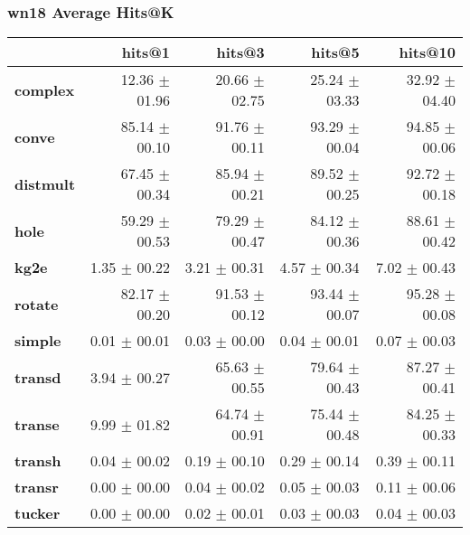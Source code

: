 \documentclass{article}
\begin{document}
\subsubsection{wn18 Average Hits@K}
    \begin{center}
    \begin{tabular}{lrrrr}
\toprule
{} &         hits@1 &         hits@3 &         hits@5 &        hits@10 \\
\midrule
\textbf{complex } &  12.36 $\pm$ 01.96 &  20.66 $\pm$ 02.75 &  25.24 $\pm$ 03.33 &  32.92 $\pm$ 04.40 \\
\textbf{conve   } &  85.14 $\pm$ 00.10 &  91.76 $\pm$ 00.11 &  93.29 $\pm$ 00.04 &  94.85 $\pm$ 00.06 \\
\textbf{distmult} &  67.45 $\pm$ 00.34 &  85.94 $\pm$ 00.21 &  89.52 $\pm$ 00.25 &  92.72 $\pm$ 00.18 \\
\textbf{hole    } &  59.29 $\pm$ 00.53 &  79.29 $\pm$ 00.47 &  84.12 $\pm$ 00.36 &  88.61 $\pm$ 00.42 \\
\textbf{kg2e    } &   1.35 $\pm$ 00.22 &   3.21 $\pm$ 00.31 &   4.57 $\pm$ 00.34 &   7.02 $\pm$ 00.43 \\
\textbf{rotate  } &  82.17 $\pm$ 00.20 &  91.53 $\pm$ 00.12 &  93.44 $\pm$ 00.07 &  95.28 $\pm$ 00.08 \\
\textbf{simple  } &   0.01 $\pm$ 00.01 &   0.03 $\pm$ 00.00 &   0.04 $\pm$ 00.01 &   0.07 $\pm$ 00.03 \\
\textbf{transd  } &   3.94 $\pm$ 00.27 &  65.63 $\pm$ 00.55 &  79.64 $\pm$ 00.43 &  87.27 $\pm$ 00.41 \\
\textbf{transe  } &   9.99 $\pm$ 01.82 &  64.74 $\pm$ 00.91 &  75.44 $\pm$ 00.48 &  84.25 $\pm$ 00.33 \\
\textbf{transh  } &   0.04 $\pm$ 00.02 &   0.19 $\pm$ 00.10 &   0.29 $\pm$ 00.14 &   0.39 $\pm$ 00.11 \\
\textbf{transr  } &   0.00 $\pm$ 00.00 &   0.04 $\pm$ 00.02 &   0.05 $\pm$ 00.03 &   0.11 $\pm$ 00.06 \\
\textbf{tucker  } &   0.00 $\pm$ 00.00 &   0.02 $\pm$ 00.01 &   0.03 $\pm$ 00.03 &   0.04 $\pm$ 00.03 \\
\bottomrule
\end{tabular}

    \end{center}
\end{document}
